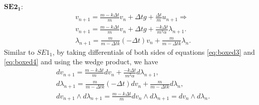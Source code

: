 \documentclass[a4paper, 10pt]{article}
\newcommand{\SEoo}{SE1_1}
\newcommand{\SEto}{SE2_1}
\begin{document}
$\bm{\SEto:}$
\begin{align}
&   v_{n+1} = \frac{m-k\Delta{t}}{m} v_{n} + \Delta{t}g + \frac{\Delta{t}}{m} u_{n+1} \Rightarrow \nonumber \\ &
    \boxed{v_{n+1} = \frac{m-k\Delta{t}}{m} v_{n}  + \Delta{t}g + \frac{-k\Delta{t}}{m^2\alpha} \lambda_{n+1}.}  \label{eq:boxed3}\\ &
    \boxed{\lambda_{n+1} = \frac{m}{m-\Delta{t}k}(-\Delta{t})v_{n} + \frac{m}{m-\Delta{t}k}\lambda_{n}.}  \label{eq:boxed4}
\end{align}
Similar to $\SEoo$, by taking differentials of both sides of equations \eqref{eq:boxed3} and \eqref{eq:boxed4} and using the wedge product, we have
\begin{align*}
& dv_{n+1} = \frac{m-k\Delta{t}}{m} dv_{n} + \frac{-k\Delta{t}}{m^2\alpha} d\lambda_{n+1}, \\
& d\lambda_{n+1} = \frac{m}{m-\Delta{t}k}(-\Delta{t}) dv_{n} + \frac{m}{m-\Delta{t}k} d\lambda_{n}, \\
& \boxed{dv_{n+1} \wedge d\lambda_{n+1} = \frac{m-k\Delta{t}}{m} dv_{n} \wedge d\lambda_{n+1} = dv_{n} \wedge d\lambda_{n}.}
\end{align*}
\end{document}

